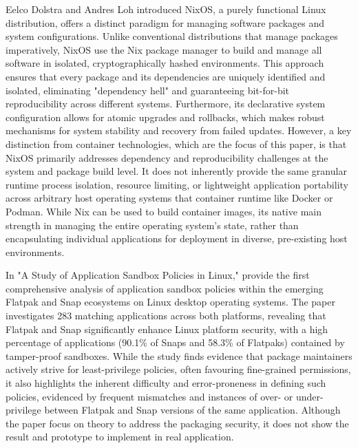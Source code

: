 \documentclass[journal,onecolumn]{IEEEtran}
\begin{document}
Eelco Dolstra and Andres Loh\cite{10.1145/1411204.1411255}\cite{10.1145/1411203.1411255} introduced NixOS, a purely functional Linux distribution, offers a distinct paradigm for managing software packages and system configurations. Unlike conventional distributions that manage packages imperatively, NixOS use the Nix package manager to build and manage all software in isolated, cryptographically hashed environments. This approach ensures that every package and its dependencies are uniquely identified and isolated, eliminating "dependency hell" and guaranteeing bit-for-bit reproducibility across different systems. Furthermore, its declarative system configuration allows for atomic upgrades and rollbacks, which makes robust mechanisms for system stability and recovery from failed updates. However, a key distinction from container technologies, which are the focus of this paper, is that NixOS primarily addresses dependency and reproducibility challenges at the system and package build level. It does not inherently provide the same granular runtime process isolation, resource limiting, or lightweight application portability across arbitrary host operating systems that container runtime like Docker or Podman. While Nix can be used to build container images, its native main strength in managing the entire operating system's state, rather than encapsulating individual applications for deployment in diverse, pre-existing host environments.

In "A Study of Application Sandbox Policies in Linux," \cite{10.1145/3532105.3535016} provide the first comprehensive analysis of application sandbox policies within the emerging Flatpak and Snap ecosystems on Linux desktop operating systems. The paper investigates 283 matching applications across both platforms, revealing that Flatpak and Snap significantly enhance Linux platform security, with a high percentage of applications (90.1\% of Snaps and 58.3\% of Flatpaks) contained by tamper-proof sandboxes. While the study finds evidence that package maintainers actively strive for least-privilege policies, often favouring fine-grained permissions, it also highlights the inherent difficulty and error-proneness in defining such policies, evidenced by frequent mismatches and instances of over- or under-privilege between Flatpak and Snap versions of the same application. Although the paper focus on theory to address the packaging security, it does not show the result and prototype to implement in real application.
\end{document}
